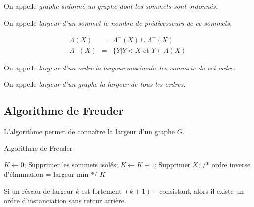 \documentclass[a4paper,11pt]{thesis}
\begin{document}
\begin{df}
    On appelle \em{graphe ordonné} un graphe dont les sommets sont ordonnés.
\end{df}
\begin{df}
    On appelle \em{largeur d'un sommet} le nombre de prédécesseurs de ce sommets.
\end{df}
\begin{note}
    \begin{displaymath}
        \begin{array}{rcl}
            \Lambda (X) & = & \Lambda^-(X) \cup \Lambda^+(X)\\
            \Lambda^-(X) & = & \{Y | Y < X \mbox{ et } Y \in \Lambda(X)
        \end{array}
    \end{displaymath}
\end{note}
\begin{df}
    On appelle \em{largeur d'un ordre} la largeur maximale des sommets de cet ordre.
\end{df}
\begin{df}
    On appelle \em{largeur d'un graphe} la largeur de tous les ordres.
\end{df}

\subsection{Algorithme de Freuder}

L'algorithme permet de connaître la largeur d'un graphe $G$.

\begin{algorithm}
    \caption{Algorithme de Freuder}
    \label{algo_freuder}
    \begin{algorithmic}[1]
        \State $K \gets 0$;
        \State Supprimer les sommets isolés;
            \State $K \gets K + 1$;
                \State Supprimer $X$;
            \EndWhile
        \EndWhile
        \State /* ordre inverse d'élimination = largeur min */
        \State \Return $K$
    \end{algorithmic}
\end{algorithm}


\begin{thrm}
    Si un réseau de largeur $k$ est fortement $(k+1)-$consistant, alors il existe un ordre
    d'instanciation sans retour arrière.
\end{thrm}
\end{document}
